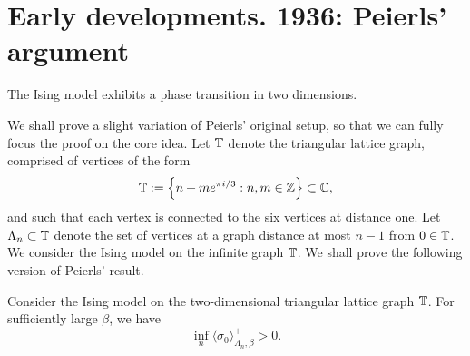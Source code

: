 \section{Early developments. 1936: Peierls' argument}
\label{sec:peierls}

\begin{theorem}[Peierls, 1936]
    \label{thm:peierls}
    The Ising model exhibits a phase transition in two dimensions.
\end{theorem}

We shall prove a slight variation of Peierls' original setup,
so that we can fully focus the proof on the core idea.
Let $\mathbb T$ denote the triangular lattice graph,
comprised of vertices of the form
\[
    \mathbb T:=\left\{n+m e^{\pi i/3}:n,m\in\mathbb Z \right\}\subset\mathbb C,
\]
and such that each vertex is connected to the six
vertices at distance one.
Let $\Lambda_n\subset\mathbb T$ denote the set of vertices at a graph
distance at most $n-1$ from $0\in\mathbb T$.
We consider the Ising model on the infinite graph $\mathbb T$.
We shall prove the following version of Peierls' result.

\begin{theorem}[Peierls, 1936]
    Consider the Ising model on the two-dimensional
    triangular lattice graph $\mathbb T$.
    For sufficiently large $\beta$,
    we have
    \[
        \inf_{n}\langle\sigma_0\rangle_{\Lambda_n,\beta}^+
        >0.
    \]
\end{theorem}


